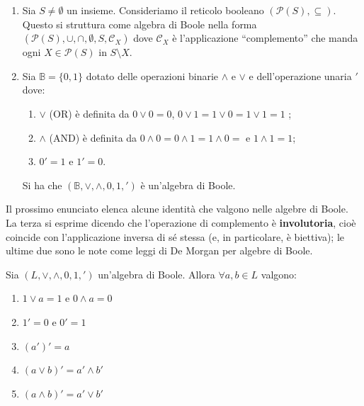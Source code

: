 \begin{example}
	\begin{enumerate}
		\item Sia $S \neq \emptyset$ un insieme. Consideriamo il reticolo booleano $(\mathcal{P}(S),\subseteq)$. Questo si struttura come algebra di Boole nella forma $(\mathcal{P}(S), \cup, \cap, \emptyset, S, \mathcal{C}_{X})$ dove $\mathcal{C}_{X}$ è l'applicazione ``complemento'' che manda ogni $X \in \mathcal{P}(S)$ in $S \setminus X$.
	
		\item Sia $\mathbb{B}=\{0,1\}$ dotato delle operazioni binarie $\wedge$ e $\vee$ e dell'operazione unaria $'$ dove:
		\begin{enumerate}
			\item $\vee$ (OR) è definita da $0\vee0 = 0$, $0 \vee 1=1 \vee 0 = 1 \vee 1 = 1$ ;
			\item $\wedge$ (AND) è definita da $0 \wedge 0 = 0 \wedge 1 = 1 \wedge 0 = $ e $1 \wedge 1 = 1$;
			\item $0'=1$ e $1'=0$.
		\end{enumerate}
		Si ha che $(\mathbb{B},\vee,\wedge,0,1,')$ è un'algebra di Boole.
	\end{enumerate}
\end{example}

Il prossimo enunciato elenca alcune identità che valgono nelle algebre di Boole. La terza si esprime dicendo che l’operazione di complemento è \textbf{involutoria}, cioè coincide con l’applicazione inversa di sé stessa (e, in particolare, è biettiva); le ultime due sono le note come leggi di De Morgan per algebre di Boole.

\begin{propbox}	
	Sia $(L,\vee,\wedge,0,1,')$ un'algebra di Boole. Allora $\forall a,b \in L$ valgono:
	\begin{enumerate}
		\item $1 \vee a = 1$ e $0 \wedge a = 0 $
		\item $1'=0 $ e $0' = 1$
		\item $(a')'=a $
		\item $(a \vee b)' = a' \wedge b' $
		\item $(a \wedge b)' = a' \vee b'$
	\end{enumerate}
\end{propbox}

